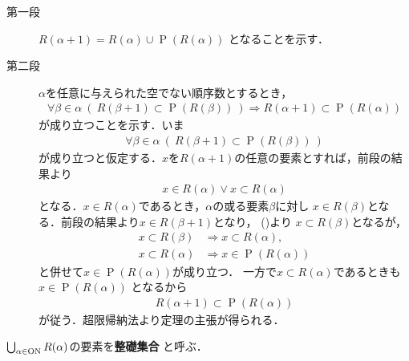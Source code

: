 	\begin{prf}\mbox{}
		\begin{description}
			\item[第一段] $R(\alpha + 1) = R(\alpha) \cup \operatorname{P}(R(\alpha))$
				となることを示す．
				
			\item[第二段] $\alpha$を任意に与えられた空でない順序数とするとき，
				\begin{align}
					\forall \beta \in \alpha\ 
					\left(\ R(\beta + 1) \subset \operatorname{P}(R(\beta))\ \right)
					\Longrightarrow R(\alpha + 1) \subset \operatorname{P}(R(\alpha))
				\end{align}
				が成り立つことを示す．いま
				\begin{align}
					\forall \beta \in \alpha\ 
					\left(\ R(\beta + 1) \subset \operatorname{P}(R(\beta))\ \right)
					\label{eq:thm_R_alpha_plus_1_equals_to_power_of_R_alpha}
				\end{align}
				が成り立つと仮定する．$x$を$R(\alpha + 1)$の任意の要素とすれば，前段の結果より
				\begin{align}
					x \in R(\alpha) \vee x \subset R(\alpha)
				\end{align}
				となる．$x \in R(\alpha)$であるとき，$\alpha$の或る要素$\beta$に対し
				$x \in R(\beta)$となる．前段の結果より$x \in R(\beta + 1)$となり，
				()より
				$x \subset R(\beta)$となるが，
				\begin{align}
					x \subset R(\beta) &\Longrightarrow x \subset R(\alpha), \\
					x \subset R(\alpha) &\Longrightarrow x \in \operatorname{P}(R(\alpha))
				\end{align}
				と併せて$x \in \operatorname{P}(R(\alpha))$が成り立つ．
				一方で$x \subset R(\alpha)$であるときも$x \in \operatorname{P}(R(\alpha))$
				となるから
				\begin{align}
					R(\alpha + 1) \subset \operatorname{P}(R(\alpha))
				\end{align}
				が従う．超限帰納法より定理の主張が得られる．
		\end{description}
	\end{prf}
	
	\begin{screen}
		\begin{dfn}[整礎集合]
			$\bigcup_{\alpha \in \mathrm{ON}} R(\alpha)$の要素を{\bf 整礎集合}
			と呼ぶ．
		\end{dfn}
	\end{screen}
	
